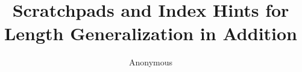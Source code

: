 \documentclass{article}
\title{Scratchpads and Index Hints for Length Generalization in Addition}
\author{Anonymous}
\begin{document}
\maketitle
\begin{abstract}

\end{abstract}




\end{document}
